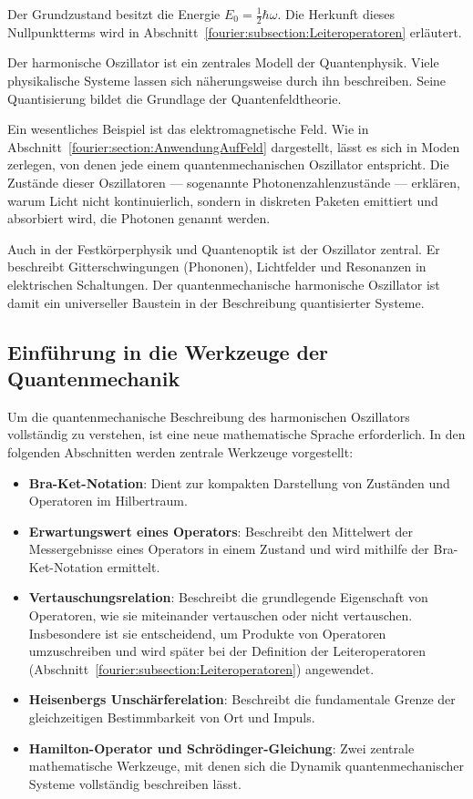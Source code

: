 Der Grundzustand besitzt die Energie $E_0 = \frac{1}{2}\hbar \omega$.
Die Herkunft dieses Nullpunktterms wird in Abschnitt~\ref{fourier:subsection:Leiteroperatoren} erläutert.
%

Der harmonische Oszillator ist ein zentrales Modell der Quantenphysik.
Viele physikalische Systeme lassen sich näherungsweise durch ihn beschreiben.
Seine Quantisierung bildet die Grundlage der Quantenfeldtheorie.

Ein wesentliches Beispiel ist das elektromagnetische Feld.
Wie in Abschnitt~\ref{fourier:section:AnwendungAufFeld} dargestellt, lässt es sich in Moden zerlegen, von denen jede einem quantenmechanischen Oszillator entspricht.
Die Zustände dieser Oszillatoren --- sogenannte Photonenzahlenzustände ---
erklären, warum Licht nicht kontinuierlich, sondern in diskreten Paketen emittiert und absorbiert wird, die Photonen genannt werden.

Auch in der Festkörperphysik und Quantenoptik ist der Oszillator zentral.
Er beschreibt Gitterschwingungen (Phononen), Lichtfelder und Resonanzen in elektrischen Schaltungen.
%
%
Der quantenmechanische harmonische Oszillator ist damit ein universeller Baustein in der Beschreibung quantisierter Systeme.

\subsection{Einführung in die Werkzeuge der Quantenmechanik\label{fourier:subsection:werkzeugeQuantenmechanik}}
Um die quantenmechanische Beschreibung des harmonischen Oszillators vollständig zu verstehen, ist eine neue mathematische Sprache erforderlich.
In den folgenden Abschnitten werden zentrale Werkzeuge vorgestellt:
\begin{itemize}
	\item \textbf{Bra-Ket-Notation}:
	Dient zur kompakten Darstellung von Zuständen und Operatoren im Hilbertraum.

	\item \textbf{Erwartungswert eines Operators}:
	Beschreibt den Mittelwert der Messergebnisse eines Operators in einem Zustand und wird mithilfe der Bra-Ket-Notation ermittelt.  

	\item \textbf{Vertauschungsrelation}:
	Beschreibt die grundlegende Eigenschaft von Operatoren, wie sie miteinander vertauschen oder nicht vertauschen.
	Insbesondere ist sie entscheidend, um Produkte von Operatoren umzuschreiben und wird später bei der Definition der Leiteroperatoren
	(Abschnitt~\ref{fourier:subsection:Leiteroperatoren}) angewendet.

	\item \textbf{Heisenbergs Unschärferelation}:
	Beschreibt die fundamentale Grenze der gleichzeitigen Bestimmbarkeit von Ort und Impuls.

	\item \textbf{Hamilton-Operator und Schrödinger-Gleichung}:
	Zwei zentrale mathematische Werkzeuge, mit denen sich die Dynamik quantenmechanischer Systeme vollständig beschreiben lässt.
	
\end{itemize}


